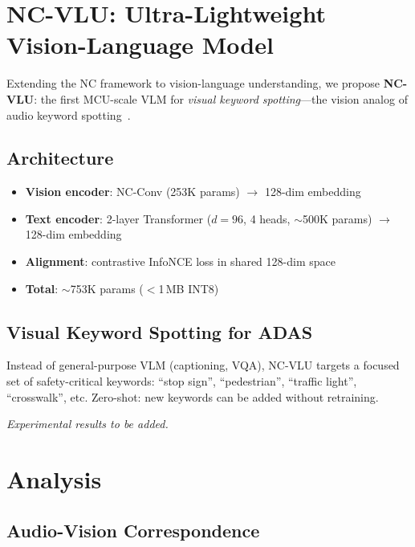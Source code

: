 \documentclass[journal]{IEEEtran}
\begin{document}
\section{NC-VLU: Ultra-Lightweight Vision-Language Model}
\label{sec:ncvlu}

Extending the NC framework to vision-language understanding, we propose \textbf{NC-VLU}: the first MCU-scale VLM for \emph{visual keyword spotting}---the vision analog of audio keyword spotting~\cite{choi2026ncssm}.

\subsection{Architecture}
\begin{itemize}
\setlength\itemsep{0pt}
\item \textbf{Vision encoder}: NC-Conv (253K params) $\to$ 128-dim embedding
\item \textbf{Text encoder}: 2-layer Transformer ($d=96$, 4 heads, $\sim$500K params) $\to$ 128-dim embedding
\item \textbf{Alignment}: contrastive InfoNCE loss in shared 128-dim space
\item \textbf{Total}: $\sim$753K params ($<$1\,MB INT8)
\end{itemize}

\subsection{Visual Keyword Spotting for ADAS}
Instead of general-purpose VLM (captioning, VQA), NC-VLU targets a focused set of safety-critical keywords:
``stop sign'', ``pedestrian'', ``traffic light'', ``crosswalk'', etc.
Zero-shot: new keywords can be added without retraining.

\textit{Experimental results to be added.}


\section{Analysis}
\label{sec:analysis}

\subsection{Audio-Vision Correspondence}
\end{document}
